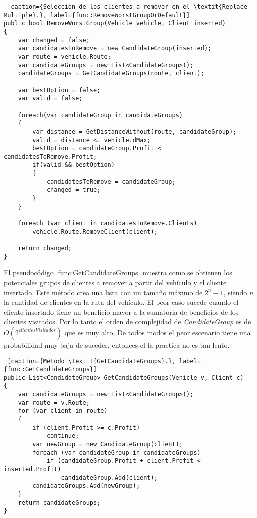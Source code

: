 \bigskip

\begin{minipage}{\textwidth}
\begin{lstlisting} [caption={Selección de los clientes a remover en el \textit{Replace Multiple}.}, label={func:RemoveWorstGroupOrDefault}]
public bool RemoveWorstGroup(Vehicle vehicle, Client inserted)
{
	var changed = false;
	var candidatesToRemove = new CandidateGroup(inserted);	
	var route = vehicle.Route;	
	var candidateGroups = new List<CandidateGroup>();
	candidateGroups = GetCandidateGroups(route, client); 	
	
	var bestOption = false;
	var valid = false;
	
	foreach(var candidateGroup in candidateGroups)
	{
		var distance = GetDistanceWithout(route, candidateGroup);
		valid = distance <= vehicle.dMax;
		bestOption = candidateGroup.Profit < candidatesToRemove.Profit;
		if(valid && bestOption)
		{
			candidatesToRemove = candidateGroup;
			changed = true;
		}
	}

	foreach (var client in candidatesToRemove.Clients)
		vehicle.Route.RemoveClient(client);

	return changed;
}
\end{lstlisting}
\end{minipage}

\bigskip

El pseudocódigo \ref{func:GetCandidateGroups} muestra como se obtienen los potenciales grupos de clientes a remover a partir del vehículo y el cliente insertado. Este método crea una lista con un tamaño máximo de $2^n-1$, siendo $n$ la cantidad de clientes en la ruta del vehículo. El peor caso sucede cuando el cliente insertado tiene un beneficio mayor a la sumatoria de beneficios de los clientes visitados. Por lo tanto el orden de complejidad de \textit{CandidateGroup} es de $O(2^{clientesVisitados})$ que es muy alto. De todos modos el peor escenario tiene una probabilidad muy baja de suceder, entonces el la practica no es tan lento.

\bigskip

\begin{minipage}{\textwidth}
\begin{lstlisting} [caption={Método \textit{GetCandidateGroups}.}, label={func:GetCandidateGroups}]
public List<CandidateGroup> GetCandidateGroups(Vehicle v, Client c)
{
	var candidateGroups = new List<CandidateGroup>();
	var route = v.Route;
	for (var client in route)
	{
		if (client.Profit >= c.Profit)
			continue;		
		var newGroup = new CandidateGroup(client);
		foreach (var candidateGroup in candidateGroups)
			if (candidateGroup.Profit + client.Profit < inserted.Profit)
				candidateGroup.Add(client);
		candidateGroups.Add(newGroup);
	}
	return candidateGroups;
}
\end{lstlisting}
\end{minipage}

